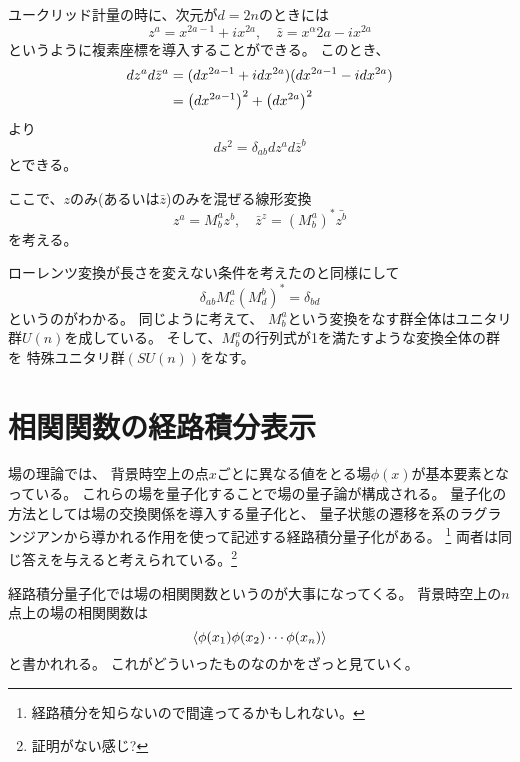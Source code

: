 \documentclass[../../master.tex]{subfiles}
\begin{document}
ユークリッド計量の時に、次元が\(d=2n\)のときには
\setcounter{equation}{10}
\begin{equation}
    z^a = x^{2a-1}+ix^{2a}, \quad \bar{z} = x^\alpha{2a} -ix^{2a}
\end{equation}
というように複素座標を導入することができる。
このとき、
\begin{align*}
    dz^{a}d\bar{z}^a
    &= (dx^{2a-1}+idx^{2a})(dx^{2a-1} -idx^{2a})\\
    &= \qty(dx^{2a-1})^2 + \qty(dx^{2a})^2
\end{align*}
より
\begin{equation}
    ds^2 = \delta_{ab}dz^{a}d\bar{z}^b
\end{equation}
とできる。

ここで、\(z\)のみ(あるいは\(\bar{z}\))のみを混ぜる線形変換
\begin{equation}
    z^a = M^a_b z^b, \quad \bar{z}^z = (M^a_b)^* \bar{z^b}
\end{equation}
を考える。

ローレンツ変換が長さを変えない条件を考えたのと同様にして
\begin{equation}
    \delta_{ab} M^a_c(M^b_d)^* = \delta_{bd}
\end{equation}
というのがわかる。
同じように考えて、
\(M^a_b\)という変換をなす群全体はユニタリ群\(U(n)\)を成している。
そして、\(M^a_b\)の行列式が1を満たすような変換全体の群を
特殊ユニタリ群\((SU(n))\)をなす。
\setcounter{equation}{15}

\section{相関関数の経路積分表示}
場の理論では、
背景時空上の点\(x\)ごとに異なる値をとる場\(\phi(x)\)が基本要素となっている。
これらの場を量子化することで場の量子論が構成される。
量子化の方法としては場の交換関係を導入する量子化と、
量子状態の遷移を系のラグランジアンから導かれる作用を使って記述する経路積分量子化がある。
\footnote{経路積分を知らないので間違ってるかもしれない。}
両者は同じ答えを与えると考えられている。\footnote{証明がない感じ?}

経路積分量子化では場の相関関数というのが大事になってくる。
背景時空上の\(n\)点上の場の相関関数は
\begin{equation}
    \ev{\phi(x_1)\phi(x_2)\cdots\phi(x_n)}
\end{equation}
と書かれれる。
これがどういったものなのかをざっと見ていく。
\end{document}
